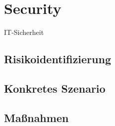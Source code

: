 \section{Security}
IT-Sicherheit

\subsection{Risikoidentifizierung}
\subsection{Konkretes Szenario}
\subsection{Maßnahmen}